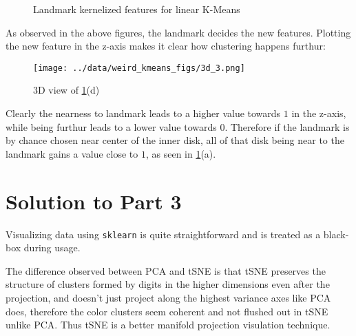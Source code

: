 \documentclass[a4paper,11pt]{article}
\begin{document}
\begin{mlsolution}
\begin{figure}[H]
    \centering
    
    \caption{Landmark kernelized features for linear K-Means}
    \label{fig:part5.2.2}
\end{figure}

As observed in the above figures, the landmark decides the new features. Plotting the new feature in the z-axis makes it clear how clustering happens furthur:

\begin{figure}[H]
    \centering
    \texttt{[image: ../data/weird\_kmeans\_figs/3d\_3.png]}
    \caption{3D view of \ref{fig:part5.2.2}(d)}
    \label{fig:part5.2.2.a}
\end{figure}

Clearly the nearness to landmark leads to a higher value towards $1$ in the z-axis, while being furthur leads to a lower value towards $0$. Therefore if the landmark is by chance chosen near center of the inner disk, all of that disk being near to the landmark gains a value close to $1$, as seen in \ref{fig:part5.2.2}(a).

\section*{Solution to Part 3}
Visualizing data using \texttt{sklearn} is quite straightforward and is treated as a black-box during usage.

The difference observed between PCA and tSNE is that tSNE preserves the structure of clusters formed by digits in the higher dimensions even after the projection, and doesn't just project along the highest variance axes like PCA does, therefore the color clusters seem coherent and not flushed out in tSNE unlike PCA. Thus tSNE is a better manifold projection visulation technique.


\end{mlsolution}
\end{document}

